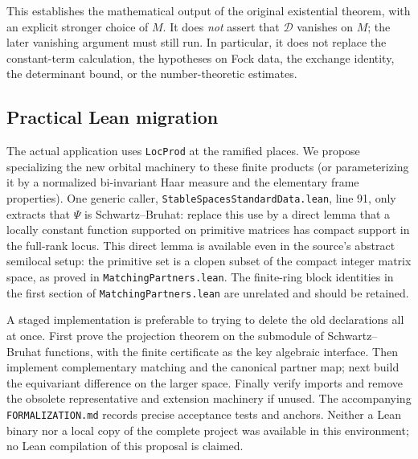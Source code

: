 \documentclass[11pt]{article}
\theoremstyle{remark}\newtheorem{remark}[theorem]{Remark}
\begin{document}
This establishes the mathematical output of the original existential theorem, with an explicit stronger choice of $M$. It does \emph{not} assert that $\mathcal D$ vanishes on $M$; the later vanishing argument must still run. In particular, it does not replace the constant-term calculation, the hypotheses on Fock data, the exchange identity, the determinant bound, or the number-theoretic estimates.

\subsection{Practical Lean migration}
The actual application uses \texttt{LocProd} at the ramified places. We propose specializing the new orbital machinery to these finite products (or parameterizing it by a normalized bi-invariant Haar measure and the elementary frame properties). One generic caller, \texttt{StableSpacesStandardData.lean}, line 91, only extracts that $\Psi$ is Schwartz--Bruhat: replace this use by a direct lemma that a locally constant function supported on primitive matrices has compact support in the full-rank locus. This direct lemma is available even in the source's abstract semilocal setup: the primitive set is a clopen subset of the compact integer matrix space, as proved in \texttt{MatchingPartners.lean}. The finite-ring block identities in the first section of \texttt{MatchingPartners.lean} are unrelated and should be retained.

A staged implementation is preferable to trying to delete the old declarations all at once. First prove the projection theorem on the submodule of Schwartz--Bruhat functions, with the finite certificate as the key algebraic interface. Then implement complementary matching and the canonical partner map; next build the equivariant difference on the larger space. Finally verify imports and remove the obsolete representative and extension machinery if unused. The accompanying \texttt{FORMALIZATION.md} records precise acceptance tests and anchors. Neither a Lean binary nor a local copy of the complete project was available in this environment; no Lean compilation of this proposal is claimed.
\end{document}
